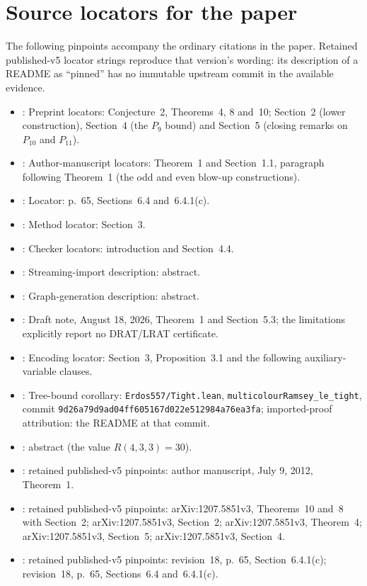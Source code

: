 \section{Source locators for the paper}
The following pinpoints accompany the ordinary citations in the paper. Retained published-v5 locator strings reproduce that version's wording: its description of a README as ``pinned'' has no immutable upstream commit in the available evidence.
\begin{itemize}
\item \cite{DDR16}: Preprint locators: Conjecture~2, Theorems~4, 8 and~10; Section~2 (lower construction), Section~4 (the $P_9$ bound) and Section~5 (closing remarks on $P_{10}$ and $P_{11}$).
\item \cite{GRSS07}: Author-manuscript locators: Theorem~1 and Section~1.1, paragraph following Theorem~1 (the odd and even blow-up constructions).
\item \cite{Rad26}: Locator: p.~65, Sections~6.4 and~6.4.1(c).
\item \cite{HKWB12}: Method locator: Section~3.
\item \cite{BBC+25}: Checker locators: introduction and Section~4.4.
\item \cite{Sze26}: Streaming-import description: abstract.
\item \cite{KMS26}: Graph-generation description: abstract.
\item \cite{Gal26}: Draft note, August 18, 2026, Theorem~1 and Section~5.3; the limitations explicitly report no DRAT/LRAT certificate.
\item \cite{CGLR96}: Encoding locator: Section~3, Proposition~3.1 and the following auxiliary-variable clauses.
\item \cite{ZhJ26}: Tree-bound corollary: \texttt{Erdos557/Tight.lean}, \texttt{multicolourRamsey\_le\_tight}, commit \texttt{9d26a79d9ad04ff605167d022e512984a76ea3fa}; imported-proof attribution: the README at that commit.
\item \cite{CFIM16}: abstract (the value $R(4,3,3)=30$).
\item \cite{GRSS07}: retained published-v5 pinpoints: author manuscript, July 9, 2012, Theorem~1.
\item \cite{DDR16}: retained published-v5 pinpoints: arXiv:1207.5851v3, Theorems~10 and~8 with Section~2; arXiv:1207.5851v3, Section~2; arXiv:1207.5851v3, Theorem~4; arXiv:1207.5851v3, Section~5; arXiv:1207.5851v3, Section~4.
\item \cite{Rad26}: retained published-v5 pinpoints: revision~18, p.~65, Section~6.4.1(c); revision~18, p.~65, Sections~6.4 and~6.4.1(c).

\end{itemize}
